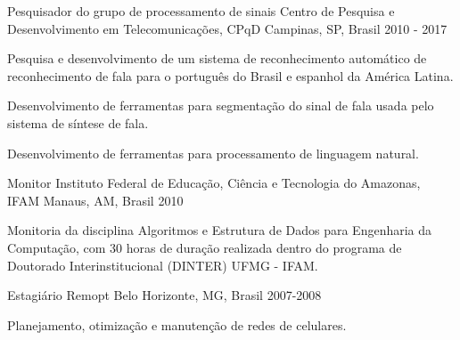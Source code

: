 

\begin{cventries}

  \cventry
    {Pesquisador do grupo de processamento de sinais} %
    {Centro de Pesquisa e Desenvolvimento em Telecomunicações, CPqD} %
    {Campinas, SP, Brasil} %
    {2010 - 2017} %
    {
      \begin{cvitems} %
        \item {Pesquisa e desenvolvimento de um sistema de reconhecimento automático de reconhecimento de fala para o português do Brasil e espanhol da América Latina.}
        \item {Desenvolvimento de ferramentas para segmentação do sinal de fala usada pelo sistema de síntese de fala.}
        \item {Desenvolvimento de ferramentas para processamento de linguagem natural.}
      \end{cvitems}
    }

  \cventry
    {Monitor} %
    {Instituto Federal de Educação, Ciência e Tecnologia do Amazonas, IFAM} %
    {Manaus, AM, Brasil} %
    {2010} %
    {
      \begin{cvitems} %
        \item {Monitoria da disciplina Algoritmos e Estrutura de Dados para Engenharia da Computação, com 30 horas de duração realizada dentro do programa de Doutorado Interinstitucional (DINTER) UFMG - IFAM.}
      \end{cvitems}
    }

  \cventry
    {Estagiário} %
    {Remopt} %
    {Belo Horizonte, MG, Brasil} %
    {2007-2008} %
    {
      \begin{cvitems} %
        \item {Planejamento, otimização e manutenção de redes de celulares.}
      \end{cvitems}
    }


\end{cventries}
